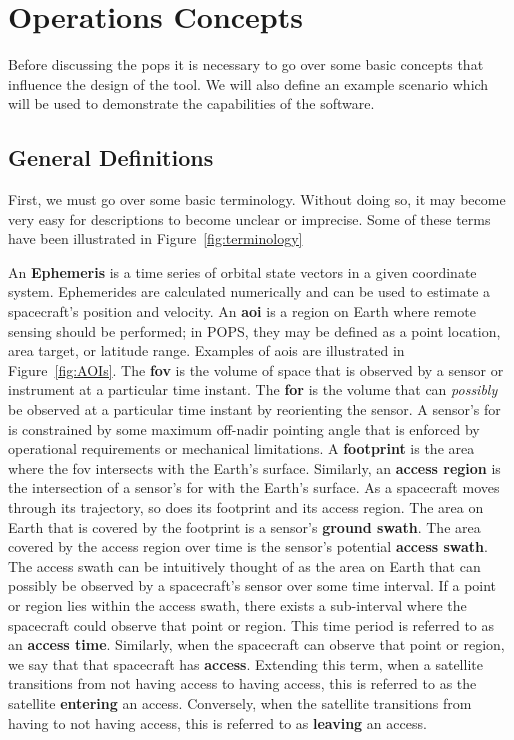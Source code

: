 \glsresetall{} 
\chapter{Operations Concepts}\label{chap:ops}

\lettrine[lines=2, findent=0pt, nindent=5pt]{B}{}efore discussing the
\gls{pops} it is necessary to go over some basic concepts that influence the
design of the tool. We will also define an example scenario which will be used
to demonstrate the capabilities of the software.

\section{General Definitions}

First, we must go over some basic terminology.  Without doing so, it may become very easy for descriptions
to become unclear or imprecise. Some of these terms have been illustrated in
Figure~\ref{fig:terminology}

An \textbf{Ephemeris} is a time series of orbital state vectors in a given
coordinate system. Ephemerides are calculated numerically and can be used to
estimate a spacecraft’s position and velocity.  An \textbf{\gls{aoi}} is a
region on Earth where remote sensing should be performed; in POPS, they may be
defined as a point location, area target, or latitude range.  Examples of
\glspl{aoi} are illustrated in Figure~\ref{fig:AOIs}. The \textbf{\gls{fov}} is
the volume of space that is observed by a sensor or instrument at a particular
time instant.  The \textbf{\gls{for}} is the volume that can \textit{possibly}
be observed at a particular time instant by reorienting the sensor. A sensor’s
\gls{for} is constrained by some maximum off-nadir pointing angle that is
enforced by operational requirements or mechanical limitations. A
\textbf{footprint} is the area where the \gls{fov} intersects with the Earth’s
surface.  Similarly, an \textbf{access region} is the intersection of a
sensor’s \gls{for} with the Earth’s surface.  As a spacecraft moves through its
trajectory, so does its footprint and its access region.  The area on Earth
that is covered by the footprint is a sensor’s \textbf{ground swath}. The area
covered by the access region over time is the sensor’s potential \textbf{access
swath}.  The access swath can be intuitively thought of as the area on Earth
that can possibly be observed by a spacecraft’s sensor over some time interval.
If a point or region lies within the access swath, there exists a sub-interval
where the spacecraft could observe that point or region. This time period is
referred to as an \textbf{access time}. Similarly, when the spacecraft can
observe that point or region, we say that that spacecraft has \textbf{access}.
Extending this term, when a satellite transitions from not having access to
having access, this is referred to as the satellite \textbf{entering} an
access. Conversely, when the satellite transitions from having to not having
access, this is referred to as \textbf{leaving} an access. 

